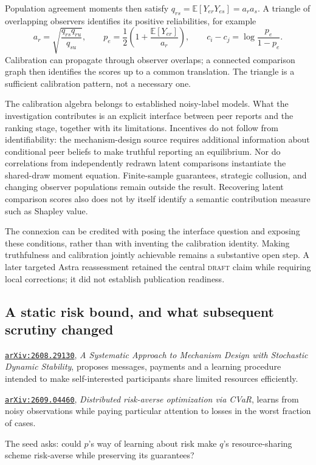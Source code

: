 \documentclass[11pt,a4paper]{article}
\renewenvironment{quote}{\tcolorbox[pairpanel]}{\endtcolorbox}
\newcommand{\pl}[1]{\noindent\llap{\makebox[1.5em][l]{\color{accent}\(#1\)}}}
\newcommand{\st}[1]{\textsc{#1}}
\newcommand{\file}[1]{\texttt{#1}}
\begin{document}
Population agreement moments then satisfy $q_{rs}=\mathbb E[Y_{er}Y_{es}]
=a_ra_s$. A triangle of overlapping observers identifies its positive
reliabilities, for example
\begin{equation}
 a_r=\sqrt{\frac{q_{rs}q_{ru}}{q_{su}}},
 \qquad
 p_e=\frac12\left(1+\frac{\mathbb E[Y_{er}]}{a_r}\right),
 \qquad
 c_i-c_j=\log\frac{p_e}{1-p_e}.
 \label{eq:pilot-calibration}
\end{equation}
Calibration can propagate through observer overlaps; a connected comparison
graph then identifies the scores up to a common translation. The triangle is a
sufficient calibration pattern, not a necessary one.

The calibration algebra belongs to established noisy-label models. What the
investigation contributes is an explicit interface between peer reports and the
ranking stage, together with its limitations. Incentives do not follow from
identifiability: the mechanism-design source requires additional information
about conditional peer beliefs to make truthful reporting an equilibrium. Nor do
correlations from independently redrawn latent comparisons instantiate the
shared-draw moment equation. Finite-sample guarantees, strategic collusion, and
changing observer populations remain outside the result. Recovering latent
comparison scores also does not by itself identify a semantic contribution
measure such as Shapley value.

The connexion can be credited with posing the interface question and exposing
these conditions, rather than with inventing the calibration identity. Making
truthfulness and calibration jointly achievable remains a substantive open step.
A later targeted Astra reassessment retained the central \st{draft} claim while
requiring local corrections; it did not establish publication readiness.

\subsection{A static risk bound, and what subsequent scrutiny changed}

\begin{quote}
\pl{q}\href{https://arxiv.org/abs/2608.29130}{\file{arXiv:2608.29130}},
\emph{A Systematic Approach to Mechanism Design with Stochastic Dynamic
Stability}, proposes messages, payments and a learning procedure intended to
make self-interested participants share limited resources efficiently.

\pl{p}\href{https://arxiv.org/abs/2609.04460}{\file{arXiv:2609.04460}},
\emph{Distributed risk-averse optimization via CVaR}, learns from noisy
observations while paying particular attention to losses in the worst
fraction of cases.

The seed asks: could \(p\)'s way of learning about risk make \(q\)'s
resource-sharing scheme risk-averse while preserving its guarantees?
\end{quote}
\end{document}
